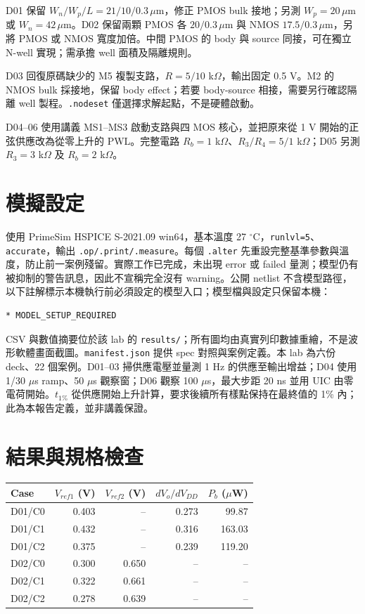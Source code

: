 D01 保留 $W_n/W_p/L=21/10/0.3\,\mu$m，修正 PMOS bulk 接地；另測 $W_p=20\,\mu$m 或 $W_n=42\,\mu$m。D02 保留兩顆 PMOS 各 $20/0.3\,\mu$m 與 NMOS $17.5/0.3\,\mu$m，另將 PMOS 或 NMOS 寬度加倍。中間 PMOS 的 body 與 source 同接，可在獨立 N-well 實現；需承擔 well 面積及隔離規則。

D03 回復原碼缺少的 M5 複製支路，$R=5/10$ k$\Omega$，輸出固定 0.5 V。M2 的 NMOS bulk 採接地，保留 body effect；若要 body-source 相接，需要另行確認隔離 well 製程。\texttt{.nodeset} 僅選擇求解起點，不是硬體啟動。

D04--06 使用講義 MS1--MS3 啟動支路與四 MOS 核心，並把原來從 1 V 開始的正弦供應改為從零上升的 PWL。完整電路 $R_b=1$ k$\Omega$、$R_3/R_4=5/1$ k$\Omega$；D05 另測 $R_3=3$ k$\Omega$ 及 $R_b=2$ k$\Omega$。

\section{模擬設定}
使用 PrimeSim HSPICE S-2021.09 win64，基本溫度 27 $^\circ$C，\texttt{runlvl=5}、\texttt{accurate}，輸出 \texttt{.op/.print/.measure}。每個 \texttt{.alter} 先重設完整基準參數與溫度，防止前一案例殘留。實際工作已完成，未出現 error 或 failed 量測；模型仍有被抑制的警告訊息，因此不宣稱完全沒有 warning。公開 netlist 不含模型路徑，以下註解標示本機執行前必須設定的模型入口；模型檔與設定只保留本機：
\begin{verbatim}
* MODEL_SETUP_REQUIRED
\end{verbatim}
CSV 與數值摘要位於該 lab 的 \texttt{results/}；所有圖均由真實列印數據重繪，不是波形軟體畫面截圖。\texttt{manifest.json} 提供 spec 對照與案例定義。本 lab 為六份 deck、22 個案例。D01--03 掃供應電壓並量測 1 Hz 的供應至輸出增益；D04 使用 1/30 $\mu$s ramp、50 $\mu$s 觀察窗；D06 觀察 100 $\mu$s，最大步距 20 ns 並用 UIC 由零電荷開始。$t_{1\%}$ 從供應開始上升計算，要求後續所有樣點保持在最終值的 1\% 內；此為本報告定義，並非講義保證。

\section{結果與規格檢查}
\begin{center}\small\begin{tabular}{lrrrr}\toprule
Case & $V_{ref1}$ (V) & $V_{ref2}$ (V) & $dV_o/dV_{DD}$ & $P_b$ ($\mu$W) \\ \midrule
D01/C0 & 0.403 & -- & 0.273 & 99.87 \\
D01/C1 & 0.432 & -- & 0.316 & 163.03 \\
D01/C2 & 0.375 & -- & 0.239 & 119.20 \\
D02/C0 & 0.300 & 0.650 & -- & -- \\
D02/C1 & 0.322 & 0.661 & -- & -- \\
D02/C2 & 0.278 & 0.639 & -- & -- \\
\bottomrule\end{tabular}\end{center}

